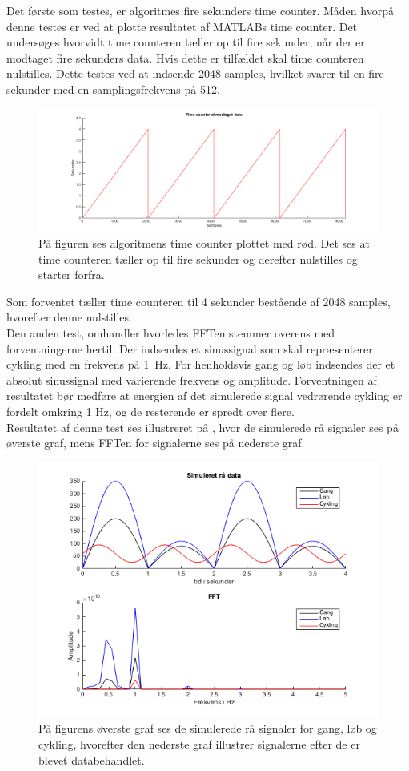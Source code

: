 Det første som testes, er algoritmes fire sekunders time counter. Måden hvorpå denne testes er ved at plotte resultatet af MATLABs time counter. Det undersøges hvorvidt time counteren tæller op til fire sekunder, når der er modtaget fire sekunders data. Hvis dette er tilfældet skal time counteren nulstilles. Dette testes ved at indsende 2048 samples, hvilket svarer til en fire sekunder med en samplingsfrekvens på 512.  
\begin{figure}[H]
	\centering
	\includegraphics[width=1.0\textwidth]{figures/cDesign/sim_counter.png}
	\caption{På figuren ses algoritmens time counter plottet med rød. Det ses at time counteren tæller op til fire sekunder og derefter nulstilles og starter forfra.}
	\label{fig:sim_count}
\end{figure}
Som forventet tæller time counteren til 4 sekunder bestående af 2048 samples, hvorefter denne nulstilles.\\
Den anden test, omhandler hvorledes FFTen stemmer overens med forventningerne hertil. Der indsendes et sinussignal som skal repræsenterer cykling med en frekvens på 1~Hz. For henholdsvis gang og løb indsendes der et absolut sinussignal med varierende frekvens og amplitude. Forventningen af resultatet bør medføre at energien af det simulerede signal vedrørende cykling er fordelt omkring 1 Hz, og de resterende er spredt over flere. \\
Resultatet af denne test ses illustreret på , hvor de simulerede rå signaler ses på øverste graf, mens FFTen for signalerne ses på nederste graf.
\begin{figure}[H]
	\centering
	\includegraphics[width=.7\textwidth]{figures/cDesign/sim_gyro.png}
	\caption{På figurens øverste graf ses de simulerede rå signaler for gang, løb og cykling, hvorefter den nederste graf illustrer signalerne efter de er blevet databehandlet.}
	\label{fig:sim_gyro}
\end{figure}\vspace{-.5cm}
